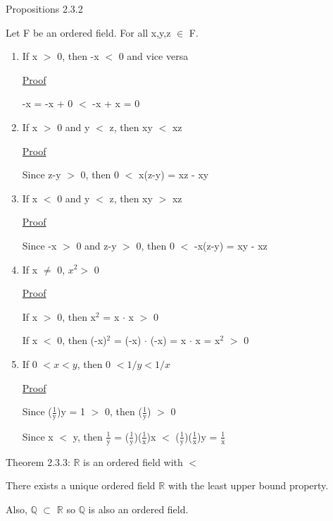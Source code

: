 { \color{blue} Propositions 2.3.2} 

	\qquad Let F be an ordered field. For all x,y,z $\in$ F.

	\begin{enumerate}[label=(\alph*), leftmargin=2cm, itemsep=0.1cm]
		\item If x $>$ 0, then -x $<$ 0 and vice versa
	
			{ \color{magenta} \underline{Proof} } 
	
				-x = -x + 0 $<$ -x + x = 0

		\item If x $>$ 0 and y $<$ z, then xy $<$ xz
	
			{ \color{magenta} \underline{Proof} } 
		
				Since z-y $>$ 0, then 0 $<$ x(z-y) = xz - xy

		\item If x $ < $ 0 and y $ < $ z, then xy $ > $ xz

			{ \color{magenta} \underline{Proof} } 
		
				Since -x $>$ 0 and z-y $>$ 0, then 0 $<$ -x(z-y) = xy - xz
	
		\item If x $\neq$ 0, $x^2 > $ 0

			{ \color{magenta} \underline{Proof} } 
		
				If x $>$ 0, then x$^\text{2}$ = x $\cdot$ x $>$ 0

				If x $<$ 0, then (-x)$^\text{2}$ = (-x) $\cdot$ (-x)
				= x $\cdot$ x = x$^\text{2}$ $>$ 0
	
		\item If 0 $< x < y$, then 0 $< 1/y < 1/x$

			{ \color{magenta} \underline{Proof} } 
		
				Since ($\frac{1}{\text{y}}$)y = 1 $>$ 0, then ($\frac{1}{\text{y}}$) $>$ 0

				Since x $<$ y, then $\frac{1}{\text{y}}$
				= ($\frac{1}{\text{y}}$)($\frac{1}{\text{x}}$)x
				$<$ ($\frac{1}{\text{y}}$)($\frac{1}{\text{x}}$)y = $\frac{1}{\text{x}}$ \\
	\end{enumerate}

{\color{red} Theorem 2.3.3: $\mathbb{R}$ is an ordered field with $<$ }

	\qquad There exists a unique ordered field $ \mathbb{R} $ with the least upper bound property.

	\qquad Also, $ \mathbb{Q} $  $\subset$ $ \mathbb{R} $ so $\mathbb{Q}$ is also an ordered field. \\

